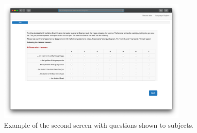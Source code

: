 \documentclass[12pt]{scrartcl}
\begin{document}
\begin{figure}[H]
   \centering
   \includegraphics[width=0.85\textwidth]{screen_2.png}
   \caption{Example of the second screen with questions shown to subjects.}
   \label{fig:screen_2}
\end{figure}

\clearpage
\end{document}
